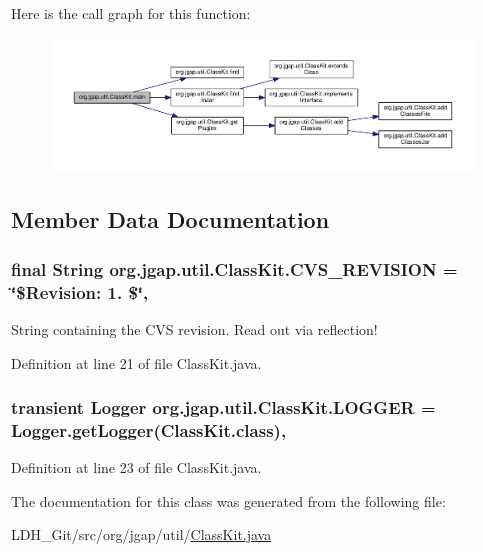 Here is the call graph for this function\-:
\nopagebreak
\begin{figure}[H]
\begin{center}
\leavevmode
\includegraphics[width=350pt]{classorg_1_1jgap_1_1util_1_1_class_kit_aa2b281a15d71471b15810fbf81587fc2_cgraph}
\end{center}
\end{figure}




\subsection{Member Data Documentation}
\hypertarget{classorg_1_1jgap_1_1util_1_1_class_kit_ab14b632520edbc8f694623ec8af2dac6}{
\subsubsection[{C\-V\-S\-\_\-\-R\-E\-V\-I\-S\-I\-O\-N}]{\setlength{\rightskip}{0pt plus 5cm}final String org.\-jgap.\-util.\-Class\-Kit.\-C\-V\-S\-\_\-\-R\-E\-V\-I\-S\-I\-O\-N = \char`\"{}\$Revision\-: 1. \$\char`\"{}\hspace{0.3cm}{\ttfamily [static]}, {\ttfamily [private]}}}\label{classorg_1_1jgap_1_1util_1_1_class_kit_ab14b632520edbc8f694623ec8af2dac6}
String containing the C\-V\-S revision. Read out via reflection! 

Definition at line 21 of file Class\-Kit.\-java.

\hypertarget{classorg_1_1jgap_1_1util_1_1_class_kit_af54f8a63e011c2eaae52d54400629293}{
\subsubsection[{L\-O\-G\-G\-E\-R}]{\setlength{\rightskip}{0pt plus 5cm}transient Logger org.\-jgap.\-util.\-Class\-Kit.\-L\-O\-G\-G\-E\-R = Logger.\-get\-Logger(Class\-Kit.\-class)\hspace{0.3cm}{\ttfamily [static]}, {\ttfamily [private]}}}\label{classorg_1_1jgap_1_1util_1_1_class_kit_af54f8a63e011c2eaae52d54400629293}


Definition at line 23 of file Class\-Kit.\-java.



The documentation for this class was generated from the following file\-:\begin{DoxyCompactItemize}
\item 
L\-D\-H\-\_\-\-Git/src/org/jgap/util/\hyperlink{_class_kit_8java}{Class\-Kit.\-java}\end{DoxyCompactItemize}
